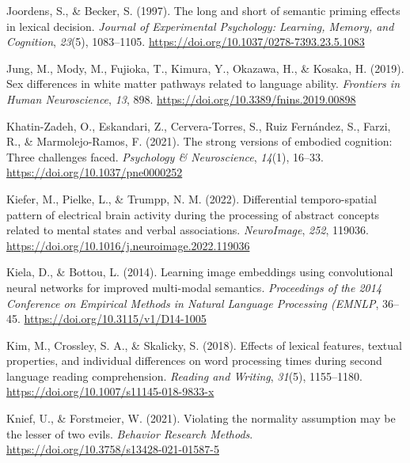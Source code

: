 \documentclass[
  12pt,
  man,floatsintext]{apa7}
\newlength{\cslhangindent}
\newlength{\cslentryspacingunit} %
\newenvironment{CSLReferences}[2] %
 {%
  \setlength{\parindent}{0pt}
  \ifodd #1
  \let\oldpar\par
  \def\par{\hangindent=\cslhangindent\oldpar}
  \fi
  \setlength{\parskip}{#2\cslentryspacingunit}
 }%
 {}
\begin{document}
\begin{CSLReferences}{1}{0}
\leavevmode{}%
Joordens, S., \& Becker, S. (1997). The long and short of semantic priming effects in lexical decision. \emph{Journal of Experimental Psychology: Learning, Memory, and Cognition}, \emph{23}(5), 1083--1105. \url{https://doi.org/10.1037/0278-7393.23.5.1083}

\leavevmode{}%
Jung, M., Mody, M., Fujioka, T., Kimura, Y., Okazawa, H., \& Kosaka, H. (2019). Sex differences in white matter pathways related to language ability. \emph{Frontiers in Human Neuroscience}, \emph{13}, 898. \url{https://doi.org/10.3389/fnins.2019.00898}

\leavevmode{}%
Khatin-Zadeh, O., Eskandari, Z., Cervera-Torres, S., Ruiz Fernández, S., Farzi, R., \& Marmolejo-Ramos, F. (2021). The strong versions of embodied cognition: {Three} challenges faced. \emph{Psychology \& Neuroscience}, \emph{14}(1), 16--33. \url{https://doi.org/10.1037/pne0000252}

\leavevmode{}%
Kiefer, M., Pielke, L., \& Trumpp, N. M. (2022). Differential temporo-spatial pattern of electrical brain activity during the processing of abstract concepts related to mental states and verbal associations. \emph{NeuroImage}, \emph{252}, 119036. \url{https://doi.org/10.1016/j.neuroimage.2022.119036}

\leavevmode{}%
Kiela, D., \& Bottou, L. (2014). Learning image embeddings using convolutional neural networks for improved multi-modal semantics. \emph{Proceedings of the 2014 Conference on Empirical Methods in Natural Language Processing ({EMNLP}}, 36--45. \url{https://doi.org/10.3115/v1/D14-1005}

\leavevmode{}%
Kim, M., Crossley, S. A., \& Skalicky, S. (2018). Effects of lexical features, textual properties, and individual differences on word processing times during second language reading comprehension. \emph{Reading and Writing}, \emph{31}(5), 1155--1180. \url{https://doi.org/10.1007/s11145-018-9833-x}

\leavevmode{}%
Knief, U., \& Forstmeier, W. (2021). Violating the normality assumption may be the lesser of two evils. \emph{Behavior Research Methods}. \url{https://doi.org/10.3758/s13428-021-01587-5}


\end{CSLReferences}
\end{document}
